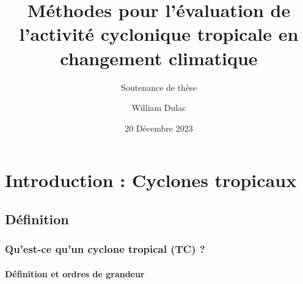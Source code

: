 \documentclass[aspectratio=169, usepdftitle=false, xcolor={dvipsnames}, 9pt,table]{beamer}
\title{Méthodes pour l'évaluation de l'activité cyclonique tropicale en changement climatique}
\author[William]{William Dulac}
\subtitle{Soutenance de thèse}
\institute{Centre National de Recherches Météorologiques}
\date{20 Décembre 2023}
\begin{document}
\maketitle

\section[Introduction]{Introduction : Cyclones tropicaux}

\makesecslide

\subsection{Définition}

\begin{frame}[t]
    \renewcommand*{\thefootnote}{\fnsymbol{footnote}}
    \frametitle{Qu'est-ce qu'un cyclone tropical (TC) ?}
    \framesubtitle{Définition et ordres de grandeur}


\end{frame}
\end{document}
